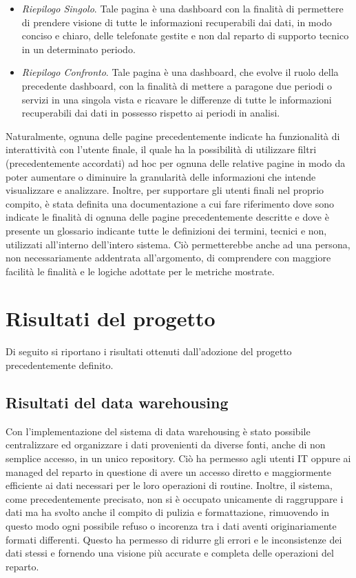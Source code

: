 \begin{enumerate}
\begin{itemize}
        \item \textit{Riepilogo Singolo}. Tale pagina è una dashboard con la finalità di permettere di prendere visione di tutte le informazioni recuperabili dai dati, in modo conciso e chiaro, delle telefonate gestite e non dal reparto di supporto tecnico in un determinato periodo.
        \item \textit{Riepilogo Confronto}. Tale pagina è una dashboard, che evolve il ruolo della precedente dashboard, con la finalità di mettere a paragone due periodi o servizi in una singola vista e ricavare le differenze di tutte le informazioni recuperabili dai dati in possesso rispetto ai periodi in analisi.
    \end{itemize}
\end{enumerate}

Naturalmente, ognuna delle pagine precedentemente indicate ha funzionalità di interattività con l'utente finale, il quale ha la possibilità di utilizzare filtri (precedentemente accordati) ad hoc per ognuna delle relative pagine in modo da poter aumentare o diminuire la granularità delle informazioni che intende visualizzare e analizzare.
Inoltre, per supportare gli utenti finali nel proprio compito, è stata definita una documentazione a cui fare riferimento dove sono indicate le finalità di ognuna delle pagine precedentemente descritte e dove è presente un glossario indicante tutte le definizioni dei termini, tecnici e non, utilizzati all'interno dell'intero sistema. Ciò permetterebbe anche ad una persona, non necessariamente addentrata all'argomento, di comprendere con maggiore facilità le finalità e le logiche adottate per le metriche mostrate.

\section{Risultati del progetto}

Di seguito si riportano i risultati ottenuti dall'adozione del progetto precedentemente definito.

\subsection{Risultati del data warehousing}
Con l'implementazione del sistema di data warehousing è stato possibile centralizzare ed organizzare i dati provenienti da diverse fonti, anche di non semplice accesso, in un unico repository. Ciò ha permesso agli utenti IT oppure ai managed del reparto in questione di avere un accesso diretto e maggiormente efficiente ai dati necessari per le loro operazioni di routine. Inoltre, il sistema, come precedentemente precisato, non si è occupato unicamente di raggruppare i dati ma ha svolto anche il compito di pulizia e formattazione, rimuovendo in questo modo ogni possibile refuso o incorenza tra i dati aventi originariamente formati differenti. Questo ha permesso di ridurre gli errori e le inconsistenze dei dati stessi e fornendo una visione più accurate e completa delle operazioni del reparto.


